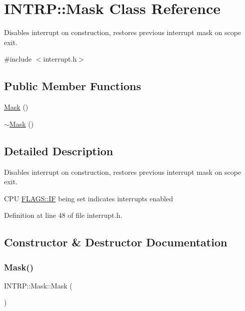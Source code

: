 \hypertarget{class_i_n_t_r_p_1_1_mask}{}\section{I\+N\+T\+RP\+:\+:Mask Class Reference}
\label{class_i_n_t_r_p_1_1_mask}


Disables interrupt on construction, restores previous interrupt mask on scope exit.  




{\ttfamily \#include $<$interrupt.\+h$>$}

\subsection*{Public Member Functions}
\begin{DoxyCompactItemize}
\item 
\hyperlink{class_i_n_t_r_p_1_1_mask_addd528b308ed524deeac0c632e07d467}{Mask} ()
\item 
\hyperlink{class_i_n_t_r_p_1_1_mask_a9510ca576c94618168e76d14521c3e6d}{$\sim$\+Mask} ()
\end{DoxyCompactItemize}


\subsection{Detailed Description}
Disables interrupt on construction, restores previous interrupt mask on scope exit. 

C\+PU \hyperlink{namespace_f_l_a_g_s_a2e8c1de25986c4a7ecca3f86a2a7ed95aec02296c8246d8621db2de2314b6728d}{F\+L\+A\+G\+S\+::\+IF} being set indicates interrupts enabled 

Definition at line 48 of file interrupt.\+h.



\subsection{Constructor \& Destructor Documentation}
\mbox{\label{class_i_n_t_r_p_1_1_mask_addd528b308ed524deeac0c632e07d467}} 
\subsubsection{\texorpdfstring{Mask()}{Mask()}}
{\footnotesize\ttfamily I\+N\+T\+R\+P\+::\+Mask\+::\+Mask (\begin{DoxyParamCaption}{ }\end{DoxyParamCaption})\hspace{0.3cm}{\ttfamily [inline]}}



